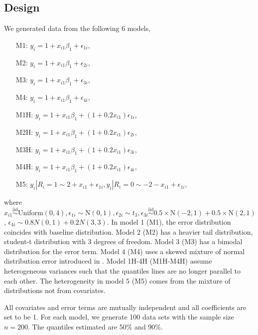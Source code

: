 \documentclass[12pt]{article}
\begin{document}
\subsection{Design}
We generated data from the following 6 models,
\begin{itemize}
\item [M1:] $y_i = 1 + x_{i1}\beta_1 + \epsilon_{1i}$,
\item [M2:] $y_i = 1 + x_{i1}\beta_1 + \epsilon_{2i}$,
\item [M3:] $y_i = 1 + x_{i1}\beta_1 + \epsilon_{3i}$,
\item [M4:] $y_i = 1 + x_{i1}\beta_1 + \epsilon_{4i}$,
\item [M1H:] $y_i = 1 + x_{i1}\beta_1 + (1 + 0.2x_{i1})
  \epsilon_{1i}$,
\item [M2H:] $y_i = 1 + x_{i1}\beta_1 + (1 + 0.2x_{i1})
  \epsilon_{2i}$,
\item [M3H:] $y_i = 1 + x_{i1}\beta_1 + (1 + 0.2x_{i1})
  \epsilon_{3i}$,
\item [M4H:] $y_i = 1 + x_{i1}\beta_1 + (1 + 0.2x_{i1})
  \epsilon_{4i}$,
\item [M5:] $y_{i} | R_i = 1 \sim 2 + x_{i1} + \epsilon_{1i}, y_{i}|
  R_i = 0 \sim -2 - x_{i1} + \epsilon_{1i}$,
\end{itemize}
where $x_{i1} \stackrel{\mbox{iid}}{\sim} \mathrm{Uniform}(0,4),
\epsilon_{1i} \sim \mathrm{N}(0,1), \epsilon_{2i} \sim t_3,
\epsilon_{3i} \stackrel{\mbox{iid}}{\sim} 0.5 \times \mathrm{N}(-2,1)
+ 0.5 \times \mathrm{N}(2,1)$, $\epsilon_{4i} \sim 0.8 N(0,1) + 0.2
N(3,3)$. In model 1 (M1), the
error distribution coincides with baseline distribution. Model 2 (M2)
has a heavier tail distribution, student-t distribution with 3 degrees
of freedom. Model 3 (M3) has a bimodal distribution for the error
term.  Model 4 (M4) uses a skewed mixture of normal distribution error
introduced in \citet{reich2010}. Model 1H-4H (M1H-M4H) assume
heterogeneous variances such that the quantiles lines are no longer
parallel to each other. The heterogeneity in model 5 (M5)
 comes from the mixture of distributions
not from covariates.

All covariates and error terms are mutually independent and all
coefficients are set to be 1. For each model, we generate 100 data
sets with the sample size $n=200$. The quantiles estimated are 50\% and
90\%.
\end{document}
